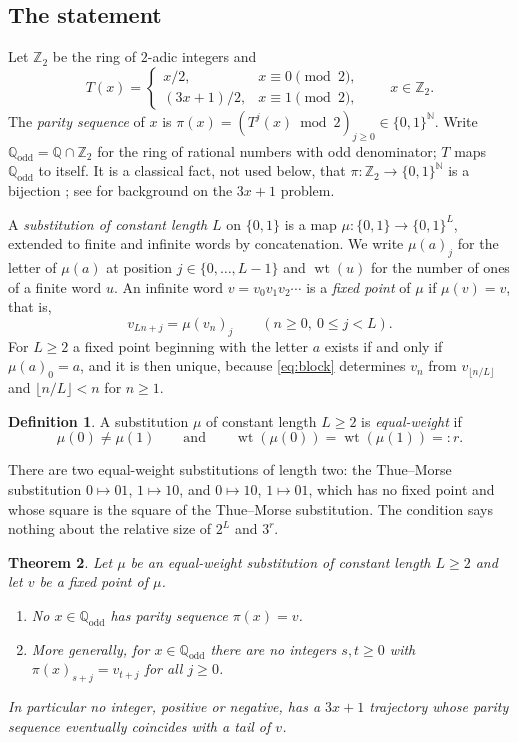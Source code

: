 \documentclass[11pt,reqno]{amsart}
\newtheorem{theorem}{Theorem}[section]
\theoremstyle{definition}
\newtheorem{definition}[theorem]{Definition}
\theoremstyle{remark}
\newcommand{\N}{\mathbb{N}}
\newcommand{\Q}{\mathbb{Q}}
\newcommand{\Zt}{\mathbb{Z}_2}
\newcommand{\Qodd}{\mathbb{Q}_{\mathrm{odd}}}
\newcommand{\wt}{\operatorname{wt}}
\begin{document}
\subsection{The statement}
Let $\Zt$ be the ring of $2$-adic integers and
\[
  T(x)=\begin{cases} x/2, & x\equiv 0 \pmod 2,\\ (3x+1)/2, & x\equiv 1 \pmod 2,\end{cases}
  \qquad x\in\Zt .
\]
The \emph{parity sequence} of $x$ is
$\pi(x)=(T^{j}(x)\bmod 2)_{j\ge 0}\in\{0,1\}^{\N}$.  Write
$\Qodd=\Q\cap\Zt$ for the ring of rational numbers with odd denominator;
$T$ maps $\Qodd$ to itself.  It is a classical fact, not used below, that
$\pi\colon\Zt\to\{0,1\}^{\N}$ is a bijection \cite{BernsteinLagarias1996};
see \cite{Lagarias1985} for background on the $3x+1$ problem.

A \emph{substitution of constant length $L$} on $\{0,1\}$ is a map
$\mu\colon\{0,1\}\to\{0,1\}^{L}$, extended to finite and infinite words by
concatenation.  We write $\mu(a)_j$ for the letter of $\mu(a)$ at position
$j\in\{0,\dots,L-1\}$ and $\wt(u)$ for the number of ones of a finite word
$u$.  An infinite word $v=v_0v_1v_2\cdots$ is a \emph{fixed point} of $\mu$
if $\mu(v)=v$, that is,
\begin{equation}\label{eq:block}
  v_{Ln+j}=\mu(v_n)_j\qquad(n\ge 0,\ 0\le j<L).
\end{equation}
For $L\ge 2$ a fixed point beginning with the letter $a$ exists if and only
if $\mu(a)_0=a$, and it is then unique, because \eqref{eq:block} determines
$v_n$ from $v_{\lfloor n/L\rfloor}$ and $\lfloor n/L\rfloor<n$ for $n\ge 1$.

\begin{definition}\label{def:admissible}
A substitution $\mu$ of constant length $L\ge 2$ is \emph{equal-weight} if
\[
  \mu(0)\ne\mu(1)\qquad\text{and}\qquad \wt(\mu(0))=\wt(\mu(1))=:r .
\]
\end{definition}

There are two equal-weight substitutions of length two: the Thue--Morse
substitution $0\mapsto 01$, $1\mapsto 10$, and $0\mapsto 10$, $1\mapsto 01$,
which has no fixed point and whose square is the square of the Thue--Morse
substitution.  The condition says nothing about the relative size of
$2^{L}$ and $3^{r}$.

\begin{theorem}\label{thm:main}
Let $\mu$ be an equal-weight substitution of constant length $L\ge 2$ and
let $v$ be a fixed point of $\mu$.
\begin{enumerate}
\item No $x\in\Qodd$ has parity sequence $\pi(x)=v$.
\item More generally, for $x\in\Qodd$ there are no integers $s,t\ge 0$ with
$\pi(x)_{s+j}=v_{t+j}$ for all $j\ge 0$.
\end{enumerate}
In particular no integer, positive or negative, has a $3x+1$ trajectory
whose parity sequence eventually coincides with a tail of $v$.
\end{theorem}
\end{document}
